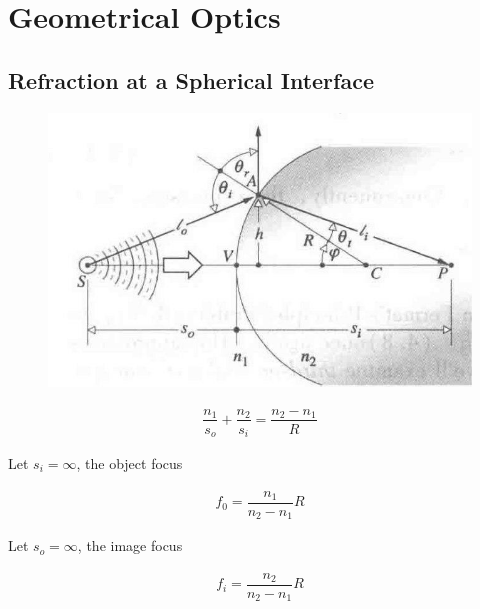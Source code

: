 

\chapter{Geometrical Optics}

\section{Refraction at a Spherical Interface}

\begin{figure}[H]
  \centering
  \includegraphics[width=0.4\linewidth]{figures/Refraction at a Spherical Interface}
  \label{fig:}
\end{figure}

\begin{equation*}
  \begin{aligned}
    \dfrac{n_1}{s_o} + \dfrac{n_2}{s_i} = \dfrac{n_2 - n_1}{R}   
  \end{aligned}
\end{equation*}

Let $s_i = \infty$, the object focus

\begin{equation*}
  \begin{aligned}
    f_0 = \dfrac{n_1}{n_2 - n_1} R 
  \end{aligned}
\end{equation*}

Let $s_o = \infty$, the image focus

\begin{equation*}
  \begin{aligned}
    f_i = \dfrac{n_2}{n_2 - n_1} R 
  \end{aligned}
\end{equation*}

